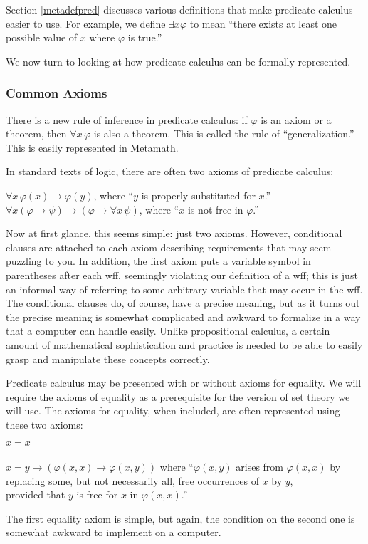 Section \ref{metadefpred} discusses various definitions
that make predicate calculus easier to use.
For example, we define
$\exists x \varphi$ to mean
``there exists at least one possible value of $x$ where $\varphi$ is true.''

We now turn to looking at how predicate calculus can be formally
represented.

\subsubsection{Common Axioms}

There is a new rule of inference in predicate calculus:  if $\varphi$ is
an axiom or a theorem, then $\forall x \,\varphi$ is also a
theorem.  This is called the rule of
``generalization.''
This is easily represented in Metamath.

In standard texts of logic, there are often two axioms of predicate
calculus:
\begin{center}
  $\forall x \,\varphi ( x ) \rightarrow \varphi ( y )$,
      where ``$y$ is properly substituted for $x$.''\\
  $\forall x ( \varphi \rightarrow \psi )\rightarrow ( \varphi \rightarrow
    \forall x\, \psi )$,
    where ``$x$ is not free in $\varphi$.''
\end{center}

Now at first glance, this seems simple:  just two axioms.  However,
conditional clauses are attached to each axiom describing requirements that
may seem puzzling to you.  In addition, the first axiom puts a variable symbol
in parentheses after each wff, seemingly violating our definition of a
wff; this is just an informal way of
referring to some arbitrary variable that may occur in the wff.  The
conditional clauses do, of course, have a precise meaning, but as it turns out
the precise meaning is somewhat complicated and awkward to formalize in a
way that a computer can handle easily.  Unlike propositional calculus, a
certain amount of mathematical sophistication and practice is needed to be
able to easily grasp and manipulate these concepts correctly.

Predicate calculus may be presented with or without axioms for
equality. We will require the
axioms of equality as a prerequisite for the version of set theory we will
use.  The axioms for equality, when included, are often represented using these
two axioms:
\begin{center}
$x=x$\\ \ \\
$x=y\rightarrow (\varphi(x,x)\rightarrow\varphi(x,y))$ where ``$\varphi(x,y)$
   arises from $\varphi(x,x)$ by replacing some, but not necessarily all,
   free
   occurrences of $x$ by $y$,\\ provided that $y$ is free for $x$
   in $\varphi(x,x)$.'' \end{center}
The first equality axiom is simple, but again,
the condition on the second one is
somewhat awkward to implement on a computer.

